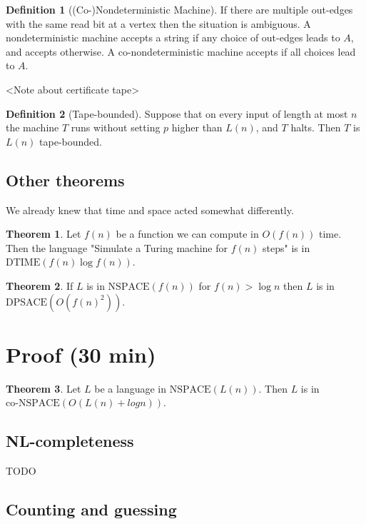 \documentclass{article}
\theoremstyle{definition}
\newtheorem{definition}{Definition}
\theoremstyle{example}
\newtheorem{theorem}{Theorem}
\theoremstyle{plain}
\theoremstyle{plain}
\theoremstyle{definition}
\begin{document}
\begin{definition}[(Co-)Nondeterministic Machine]
If there are multiple out-edges with the same read bit at a vertex then the situation is ambiguous. A nondeterministic machine accepts a string if any choice of out-edges leads to $A$, and accepts otherwise. A co-nondeterministic machine accepts if all choices lead to $A$.
\end{definition}

<Note about certificate tape>

\begin{definition}[Tape-bounded]
Suppose that on every input of length at most $n$ the machine $T$ runs without setting $p$ higher than $L(n)$, and $T$ halts. Then $T$ is $L(n)$ tape-bounded.
\end{definition}

\subsection{Other theorems}

We already knew that time and space acted somewhat differently.
\begin{theorem}
    Let $f(n)$ be a function we can compute in $O(f(n))$ time. Then the language "Simulate a Turing machine for $f(n)$ steps" is in $\text{DTIME}(f(n) \log f(n))$.
\end{theorem}

\begin{theorem}
    If $L$ is in $\text{NSPACE}(f(n))$ for $f(n) > \log n$ then $L$ is in $\text{DPSACE}(O(f(n)^2))$.
\end{theorem}

\section{Proof (30 min)}
\begin{theorem}
    Let $L$ be a language in $\text{NSPACE}(L(n))$. Then $L$ is in $\text{co-NSPACE}(O(L(n) + log n))$.
\end{theorem}

\subsection{NL-completeness}
TODO

\subsection{Counting and guessing}
\end{document}
